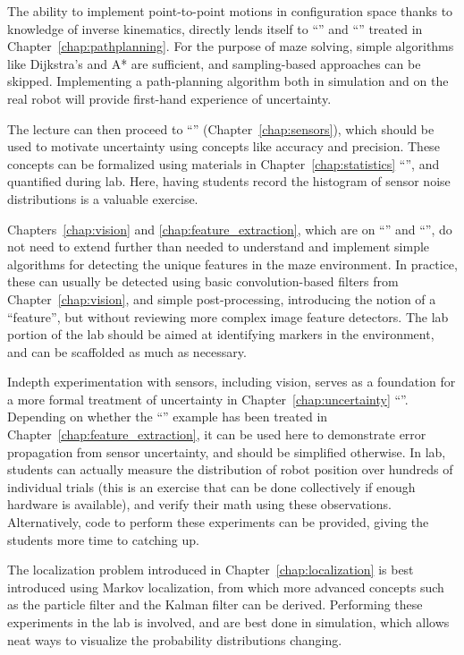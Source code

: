 \documentclass[paper=6.14in:9.21in,pagesize=pdftex,11pt,twoside,openright]{scrbook}
\begin{document}
The ability to implement point-to-point motions in configuration space thanks to knowledge of inverse kinematics, directly lends itself to ``'' and ``'' treated in Chapter~\ref{chap:pathplanning}. For the purpose of maze solving, simple algorithms like Dijkstra's and A* are sufficient, and sampling-based approaches can be skipped. Implementing a path-planning algorithm both in simulation and on the real robot will provide first-hand experience of uncertainty.

The lecture can then proceed to ``'' (Chapter~\ref{chap:sensors}), which should be used to motivate uncertainty using concepts like accuracy and precision. These concepts can be formalized using materials in Chapter~\ref{chap:statistics} ``'', and quantified during lab. Here, having students record the histogram of sensor noise distributions is a valuable exercise.

Chapters~\ref{chap:vision} and \ref{chap:feature_extraction}, which are on ``'' and ``'', do not need to extend further than needed to understand and implement simple algorithms for detecting the unique features in the maze environment. In practice, these can usually be detected using basic convolution-based filters from Chapter~\ref{chap:vision}, and simple post-processing, introducing the notion of a ``feature'', but without reviewing more complex image feature detectors. The lab portion of the lab should be aimed at identifying markers in the environment, and can be scaffolded as much as necessary.

Indepth experimentation with sensors, including vision, serves as a foundation for a more formal treatment of uncertainty in Chapter~\ref{chap:uncertainty} ``''. Depending on whether the ``'' example has been treated in Chapter~\ref{chap:feature_extraction}, it can be used here to demonstrate error propagation from sensor uncertainty, and should be simplified otherwise. In lab, students can actually measure the distribution of robot position over hundreds of individual trials (this is an exercise that can be done collectively if enough hardware is available), and verify their math using these observations. Alternatively, code to perform these experiments can be provided, giving the students more time to catching up.

The localization problem introduced in Chapter~\ref{chap:localization} is best introduced using Markov localization, from which more advanced concepts such as the particle filter and the Kalman filter can be derived. Performing these experiments in the lab is involved, and are best done in simulation, which allows neat ways to visualize the probability distributions changing.
\end{document}
